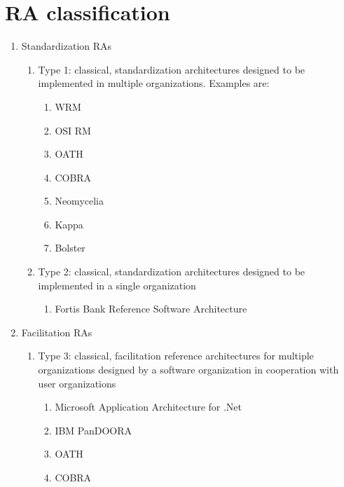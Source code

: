 \documentclass[review]{elsarticle}
\begin{document}
\section{RA classification} \label{appendixA:RA-classification}

\begin{enumerate}

    \item Standardization RAs

    \begin{enumerate}
      \item Type 1: classical, standardization architectures designed to be implemented in multiple organizations. Examples are:

      \begin{enumerate}
        \item WRM \cite{hollingsworth1995workflow}
        \item OSI RM \cite{zimmermann1980osi}
        \item OATH \cite{OATH}
        \item COBRA \cite{pope1998corba}
        \item Neomycelia \cite{AtaeiApsec}
        \item Kappa \cite{kreps2014questioning}
        \item Bolster \cite{Nadal}
      \end{enumerate}

      \item Type 2: classical, standardization architectures designed to be implemented in a single organization
      \begin{enumerate}
          \item Fortis Bank Reference Software Architecture \cite{angelov2009classification}
      \end{enumerate}
    \end{enumerate}

    \item Facilitation  RAs
    \begin{enumerate}
        \item Type 3: classical, facilitation reference architectures for multiple organizations designed by a software organization in cooperation with user organizations
        \begin{enumerate}
            \item Microsoft Application Architecture for .Net  \cite{microsoft2002application}
            \item IBM PanDOORA
            \item OATH \cite{OATH}
            \item COBRA \cite{pope1998corba}
        \end{enumerate}


\end{enumerate}
\end{enumerate}
\end{document}
